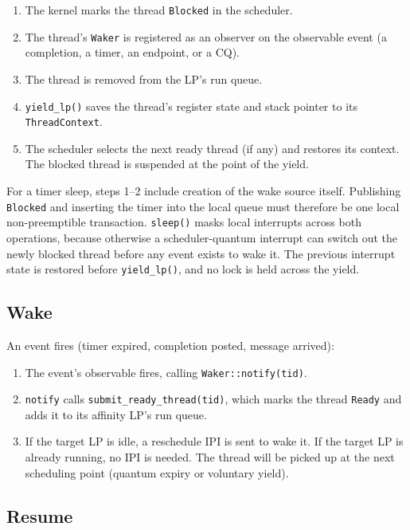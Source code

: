 \begin{enumerate}
    \item The kernel marks the thread \texttt{Blocked} in the scheduler.
    \item The thread's \texttt{Waker} is registered as an observer on the
        observable event (a completion, a timer, an endpoint, or a CQ).
    \item The thread is removed from the LP's run queue.
    \item \texttt{yield\_lp()} saves the thread's register state and stack
        pointer to its \texttt{ThreadContext}.
    \item The scheduler selects the next ready thread (if any) and restores its
        context. The blocked thread is suspended at the point of the yield.
\end{enumerate}

For a timer sleep, steps 1--2 include creation of the wake source itself.
Publishing \texttt{Blocked} and inserting the timer into the local queue must
therefore be one local non-preemptible transaction. \texttt{sleep()} masks
local interrupts across both operations, because otherwise a scheduler-quantum
interrupt can switch out the newly blocked thread before any event exists to
wake it. The previous interrupt state is restored before \texttt{yield\_lp()},
and no lock is held across the yield.

\subsection{Wake}

An event fires (timer expired, completion posted, message arrived):

\begin{enumerate}
    \item The event's observable fires, calling \texttt{Waker::notify(tid)}.
    \item \texttt{notify} calls \texttt{submit\_ready\_thread(tid)}, which marks
        the thread \texttt{Ready} and adds it to its affinity LP's run queue.
    \item If the target LP is idle, a reschedule IPI is sent to wake it.
        If the target LP is already running, no IPI is needed. The thread
        will be picked up at the next scheduling point (quantum expiry or
        voluntary yield).
\end{enumerate}

\subsection{Resume}

